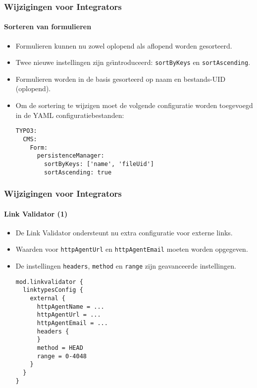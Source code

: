 \begin{frame}[fragile]
	\frametitle{Wijzigingen voor Integrators}
	\framesubtitle{Sorteren van formulieren}

	\lstset{basicstyle=\tiny\ttfamily}

	\begin{itemize}
		\item Formulieren kunnen nu zowel oplopend als aflopend worden gesorteerd.
		\item Twee nieuwe instellingen zijn ge\"{\i}ntroduceerd: \texttt{sortByKeys} en \texttt{sortAscending}.
		\item Formulieren worden in de basis gesorteerd op naam en bestands-UID (oplopend).
		\item Om de sortering te wijzigen moet de volgende configuratie worden toegevoegd in de YAML configuratiebestanden:
\begin{lstlisting}
TYPO3:
  CMS:
    Form:
      persistenceManager:
        sortByKeys: ['name', 'fileUid']
        sortAscending: true
\end{lstlisting}

	\end{itemize}

\end{frame}


\begin{frame}[fragile]
	\frametitle{Wijzigingen voor Integrators}
	\framesubtitle{Link Validator (1)}

	\lstset{basicstyle=\tiny\ttfamily}

	\begin{itemize}
		\item De Link Validator ondersteunt nu extra configuratie voor externe links.
		\item Waarden voor \texttt{httpAgentUrl} en \texttt{httpAgentEmail} moeten worden opgegeven.
		\item De instellingen \texttt{headers}, \texttt{method} en \texttt{range} zijn geavanceerde instellingen.
\begin{lstlisting}
mod.linkvalidator {
  linktypesConfig {
    external {
      httpAgentName = ...
      httpAgentUrl = ...
      httpAgentEmail = ...
      headers {
      }
      method = HEAD
      range = 0-4048
    }
  }
}
\end{lstlisting}

	\end{itemize}

\end{frame}

